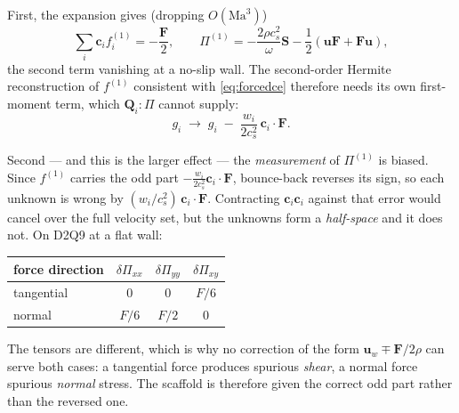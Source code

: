 \documentclass[11pt,a4paper]{article}
\newcommand{\cs}{c_s}
\newcommand{\ci}{\bm{c}_i}
\newcommand{\uu}{\bm{u}}
\begin{document}
First, the expansion gives (dropping $O(\mathrm{Ma}^3)$)
\begin{equation}
  \sum_i \ci f_i^{(1)} = -\frac{\bm F}{2},
  \qquad
  \Pi^{(1)} = -\frac{2\rho\cs^2}{\omega}\bm S - \frac12(\uu\bm F + \bm F\uu),
  \label{eq:forcedce}
\end{equation}
the second term vanishing at a no-slip wall. The second-order Hermite
reconstruction of $f^{(1)}$ consistent with \eqref{eq:forcedce} therefore needs
its own first-moment term, which $\bm Q_i\!:\!\Pi$ cannot supply:
\begin{equation}
  g_i \;\rightarrow\; g_i \;-\; \frac{w_i}{2\cs^2}\,\ci\!\cdot\!\bm F .
  \label{eq:bcforce}
\end{equation}

Second --- and this is the larger effect --- the \emph{measurement} of
$\Pi^{(1)}$ is biased. Since $f^{(1)}$ carries the odd part
$-\frac{w_i}{2\cs^2}\ci\!\cdot\!\bm F$, bounce-back reverses its sign, so each
unknown is wrong by $(w_i/\cs^2)\,\ci\!\cdot\!\bm F$. Contracting $\ci\ci$
against that error would cancel over the full velocity set, but the unknowns
form a \emph{half-space} and it does not. On D2Q9 at a flat wall:
\begin{center}\small
\begin{tabular}{lccc}
\toprule
force direction & $\delta\Pi_{xx}$ & $\delta\Pi_{yy}$ & $\delta\Pi_{xy}$ \\
\midrule
tangential & $0$ & $0$ & $F/6$ \\
normal     & $F/6$ & $F/2$ & $0$ \\
\bottomrule
\end{tabular}
\end{center}
\noindent The tensors are different, which is why no correction of the form
$\uu_w\mp\bm F/2\rho$ can serve both cases: a tangential force produces spurious
\emph{shear}, a normal force spurious \emph{normal} stress. The scaffold is
therefore given the correct odd part rather than the reversed one.
\end{document}
